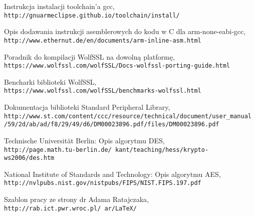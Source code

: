 \documentclass[oneside]{mgr}
\begin{document}
\begin{thebibliography}{9}
Instrukcja instalacji toolchain'a gcc,
\\\texttt{http://gnuarmeclipse.github.io/toolchain/install/}

Opis dodawania instrukcji asemblerowych do kodu w C dla arm-none-eabi-gcc,
\\\texttt{http://www.ethernut.de/en/documents/arm-inline-asm.html}

Poradnik do kompilacji WolfSSL na dowolną platformę,
\\\texttt{https://www.wolfssl.com/wolfSSL/Docs-wolfssl-porting-guide.html}

Bencharki biblioteki WolfSSL,
\\\texttt{https://www.wolfssl.com/wolfSSL/benchmarks-wolfssl.html}

Dokumentacja biblioteki Standard Peripheral Library,
\\\texttt{http://www.st.com/content/ccc/resource/technical/document/user\_manual\\/59/2d/ab/ad/f8/29/49/d6/DM00023896.pdf/files/DM00023896.pdf}

Technische Universit{\"a}t Berlin: Opis algorytmu DES,
\\\texttt{http://page.math.tu-berlin.de/~kant/teaching/hess/krypto-ws2006/des.htm}


National Institute of Standards and Technology: Opis algorytmu AES,
\\\texttt{http://nvlpubs.nist.gov/nistpubs/FIPS/NIST.FIPS.197.pdf}
 
Szablon pracy ze strony dr Adama Ratajczaka,
\\\texttt{http://rab.ict.pwr.wroc.pl/~ar/LaTeX/}
\end{thebibliography}



\listoffigures


\listoftables

\end{document}
